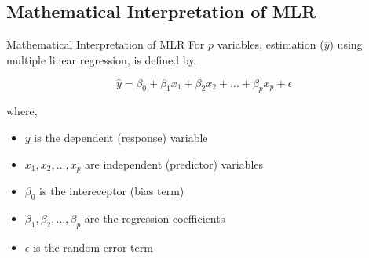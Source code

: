 \documentclass{beamer}
\begin{document}
    \subsection{Mathematical Interpretation of MLR}
    \begin{frame}{Mathematical Interpretation of MLR}
        For \(p\) variables, estimation (\(\hat{y}\)) using multiple linear regression, is defined by,

        \begin{equation}
            \hat{y}=\beta_0+\beta_1x_1+\beta_2x_2+\hdots+\beta_px_p+\epsilon
        \end{equation}

        where,

        \begin{itemize}
            \item \(y\) is the dependent (response) variable
            \item \(x_1,x_2,\hdots,x_p\) are independent (predictor) variables
            \item \(\beta_0\) is the intereceptor (bias term)
            \item \(\beta_1, \beta_2,\hdots,\beta_p\) are the regression coefficients
            \item \(\epsilon\) is the random error term
        \end{itemize}

    \end{frame}
\end{document}
